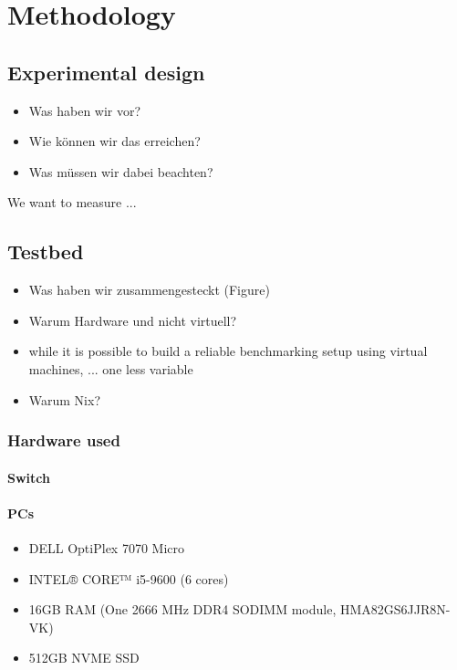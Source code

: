 
\chapter{Methodology}
\label{chap:methodology}

\section{Experimental design}

\begin{itemize}
  \item Was haben wir vor?
  \item Wie können wir das erreichen?
  \item Was müssen wir dabei beachten?
\end{itemize}
We want to measure ...


\section{Testbed}
\begin{itemize}
  \item Was haben wir zusammengesteckt (Figure)
  \item Warum Hardware und nicht virtuell?
  \item while it is possible to build a reliable benchmarking setup using virtual machines, ...
  one less variable
  \item Warum Nix?
\end{itemize}

\subsection{Hardware used}
\subsubsection{Switch}

\subsubsection{PCs}
\begin{itemize}
  \item DELL OptiPlex 7070 Micro
  \item INTEL® CORE™ i5-9600 (6 cores)
  \item 16GB RAM (One 2666 MHz DDR4 SODIMM module, HMA82GS6JJR8N-VK)
  \item 512GB NVME SSD
\end{itemize}

